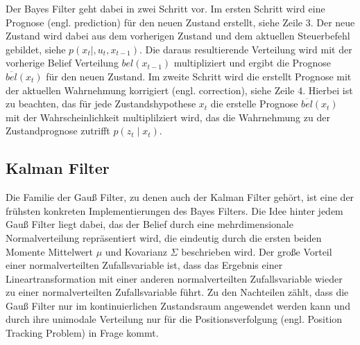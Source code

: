 Der Bayes Filter geht dabei in zwei Schritt vor. Im ersten Schritt wird eine Prognose (engl. prediction) für den neuen Zustand erstellt, siehe Zeile 3. Der neue Zustand wird dabei aus dem vorherigen Zustand und dem aktuellen Steuerbefehl gebildet, siehe $p(x_t \mid, u_t, x_{t-1})$. Die daraus resultierende Verteilung wird mit der vorherige Belief Verteilung $bel(x_{t-1})$ multipliziert und ergibt die Prognose $\overline{bel}(x_t)$ für den neuen Zustand. Im zweite Schritt wird die erstellt Prognose mit der aktuellen Wahrnehmung korrigiert (engl. correction), siehe Zeile 4. Hierbei ist zu beachten, das für jede Zustandshypothese $x_t$ die erstelle Prognose $\overline{bel}(x_t)$ mit der Wahrscheinlichkeit multiplilziert wird, das die Wahrnehmung zu der Zustandprognose zutrifft $p(z_t \mid x_t)$.


%
%
\subsection{Kalman Filter}

Die Familie der Gauß Filter, zu denen auch der Kalman Filter gehört, ist eine der frühsten konkreten Implementierungen des Bayes Filters. Die Idee hinter jedem Gauß Filter liegt dabei, das der Belief durch eine mehrdimensionale Normalverteilung repräsentiert wird, die eindeutig durch die ersten beiden Momente Mittelwert $\mu$ und Kovarianz $\Sigma$ beschrieben wird. Der große Vorteil einer normalverteilten Zufallsvariable ist, dass das Ergebnis einer Lineartransformation mit einer anderen normalverteilten Zufallsvariable wieder zu einer normalverteilten Zufallsvariable führt. Zu den Nachteilen zählt, dass die Gauß Filter nur im kontinuierlichen Zustandsraum angewendet werden kann und durch ihre unimodale Verteilung nur für die Positionsverfolgung (engl. Position Tracking Problem) in Frage kommt.

